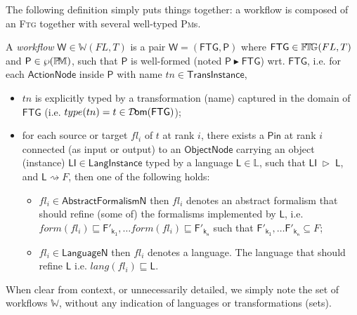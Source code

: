 \medskip
The following definition simply puts things together: a workflow is composed of 
an \textsc{Ftg} together with several well-typed \textsc{Pm}s. 

\begin{Definition}
   A \emph{workflow} $\mathsf{W}\in\mathbb{W}(FL, T)$ is a pair $\mathsf{W} = 
(\mathsf{FTG}, \mathsf{P})$ where $\mathsf{FTG}\in\mathbb{F}\!\mathbb{T}\!\mathbb{G}(FL, T)$ and 
$\mathsf{P}\in\wp(\mathbb{P}\!\mathbb{M})$, such that $\mathsf{P}$ is well-formed (noted 
$\mathsf{P} \blacktriangleright \mathsf{FTG}$) wrt. $\mathsf{FTG}$, i.e. for 
each $\mathsf{ActionNode}$ inside $\mathsf{P}$ with name 
$tn\in\mathsf{TransInstance}$,
\begin{itemize}
   \item $tn$ is explicitly typed by a transformation (name) captured in the 
domain of $\mathsf{FTG}$ (i.e. $type(tn) = t \in \mathsf{\mathcal{D}\!om}(\mathsf{FTG})$);

   \item for each source or target $fl_i$ of $t$ at rank $i$, there exists a 
$\mathsf{Pin}$ at rank $i$ connected (as input or output) to an 
$\mathsf{ObjectNode}$ carrying an object (instance) $\mathsf{LI}\in 
\mathsf{LangInstance}$ typed by a language $\mathsf{L}\in\mathbb{L}$, such that 
$\mathsf{LI} \;\rhd\; \mathsf{L}$, and $\mathsf{L}\rightsquigarrow F$, then one 
of the following holds:
   \begin{itemize}
      \item $fl_i\in \mathsf{AbstractFormalismN}$ then $fl_i$ denotes an 
abstract formalism that should refine (some 
of) the formalisms implemented by $\mathsf{L}$, i.e. $form(fl_i) \sqsubseteq 
\mathsf{F'_{k_1}}, \ldots form(fl_i) \sqsubseteq \mathsf{F'_{k_n}}$ such that 
$\mathsf{F'_{k_1}}, \ldots \mathsf{F'_{k_n}} \subseteq F$;
      
      \item $fl_i\in \mathsf{LanguageN}$ then $fl_i$ denotes a language. The 
language that should refine $\mathsf{L}$ i.e. $lang(fl_i) \sqsubseteq 
\mathsf{L}$.
   \end{itemize}
\end{itemize}
\end{Definition}
\noindent
When clear from context, or unnecessarily detailed, we simply note the set of 
workflows $\mathbb{W}$, without any indication of languages or 
transformations (sets).

